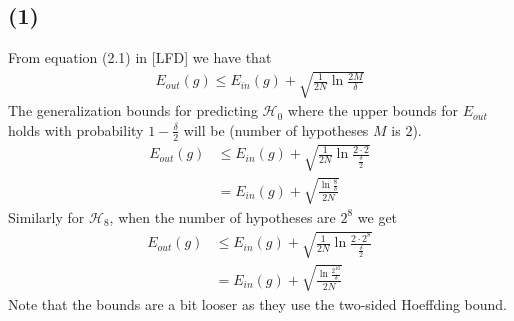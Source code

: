 \documentclass[a4paper]{article}
\begin{document}
\subsection*{(1)}
From equation (2.1) in [LFD] we have that
\begin{align*}
E_{out}(g)\leq E_{in}(g)+\sqrt{\frac{1}{2N}\ln\frac{2M}{\delta}}
\end{align*}
The generalization bounds for predicting $\mathcal{H}_0$ where the upper bounds for $E_{out}$ holds with probability $1-\frac{\delta}{2}$ will be (number of hypotheses $M$ is $2$).
\begin{align*}
E_{out}(g)&\leq E_{in}(g)+\sqrt{\frac{1}{2N}\ln\frac{2\cdot 2}{\frac{\delta}{2}}} \\
&= E_{in}(g)+\sqrt{\frac{\ln\frac{8}{\delta}}{2N}}
\end{align*}
Similarly for $\mathcal{H}_8$, when the number of hypotheses are $2^8$ we get
\begin{align*}
E_{out}(g)&\leq E_{in}(g)+\sqrt{\frac{1}{2N}\ln\frac{2\cdot 2^8}{\frac{\delta}{2}}} \\
&= E_{in}(g)+\sqrt{\frac{\ln\frac{2^{10}}{\delta}}{2N}}
\end{align*}
Note that the bounds are a bit looser as they use the two-sided Hoeffding bound.
\end{document}
